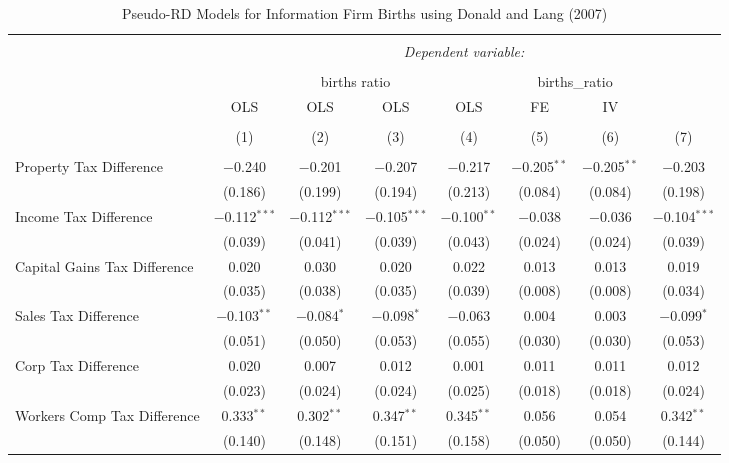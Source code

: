 
\begin{table}[!htbp] \centering 
  \caption{Pseudo-RD Models for  Information Firm Births using Donald and Lang (2007)} 
  \label{} 
\begin{tabular}{@{\extracolsep{5pt}}lccccccc} 
\\[-1.8ex]\hline 
\hline \\[-1.8ex] 
 & \multicolumn{7}{c}{\textit{Dependent variable:}} \\ 
\cline{2-8} 
\\[-1.8ex] & \multicolumn{4}{c}{births ratio} & \multicolumn{2}{c}{births\_ratio} &   \\ 
 & OLS & OLS & OLS & OLS & FE & IV &  \\ 
\\[-1.8ex] & (1) & (2) & (3) & (4) & (5) & (6) & (7)\\ 
\hline \\[-1.8ex] 
 Property Tax Difference & $-$0.240 & $-$0.201 & $-$0.207 & $-$0.217 & $-$0.205$^{**}$ & $-$0.205$^{**}$ & $-$0.203 \\ 
  & (0.186) & (0.199) & (0.194) & (0.213) & (0.084) & (0.084) & (0.198) \\ 
  Income Tax Difference & $-$0.112$^{***}$ & $-$0.112$^{***}$ & $-$0.105$^{***}$ & $-$0.100$^{**}$ & $-$0.038 & $-$0.036 & $-$0.104$^{***}$ \\ 
  & (0.039) & (0.041) & (0.039) & (0.043) & (0.024) & (0.024) & (0.039) \\ 
  Capital Gains Tax Difference & 0.020 & 0.030 & 0.020 & 0.022 & 0.013 & 0.013 & 0.019 \\ 
  & (0.035) & (0.038) & (0.035) & (0.039) & (0.008) & (0.008) & (0.034) \\ 
  Sales Tax Difference & $-$0.103$^{**}$ & $-$0.084$^{*}$ & $-$0.098$^{*}$ & $-$0.063 & 0.004 & 0.003 & $-$0.099$^{*}$ \\ 
  & (0.051) & (0.050) & (0.053) & (0.055) & (0.030) & (0.030) & (0.053) \\ 
  Corp Tax Difference & 0.020 & 0.007 & 0.012 & 0.001 & 0.011 & 0.011 & 0.012 \\ 
  & (0.023) & (0.024) & (0.024) & (0.025) & (0.018) & (0.018) & (0.024) \\ 
  Workers Comp Tax Difference & 0.333$^{**}$ & 0.302$^{**}$ & 0.347$^{**}$ & 0.345$^{**}$ & 0.056 & 0.054 & 0.342$^{**}$ \\ 
  & (0.140) & (0.148) & (0.151) & (0.158) & (0.050) & (0.050) & (0.144) \\ 

\end{tabular}
\end{table}
